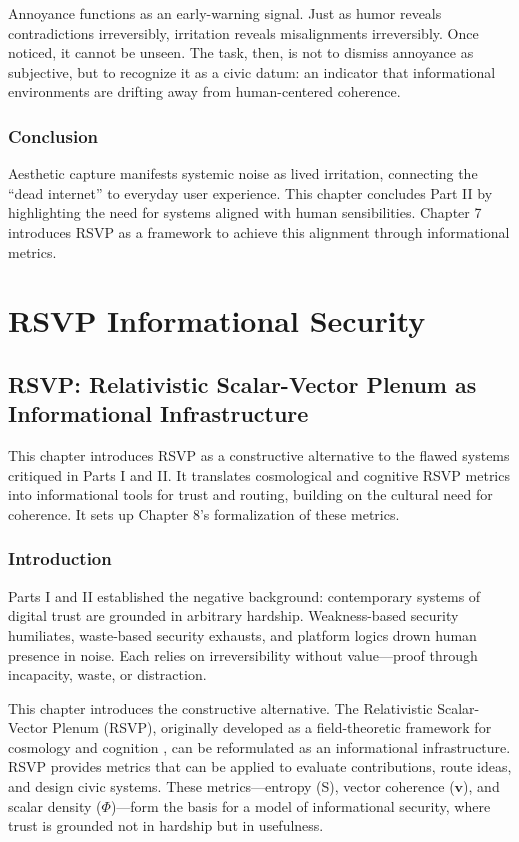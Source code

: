 \documentclass{book}
\begin{document}
Annoyance functions as an early-warning signal. Just as humor reveals contradictions irreversibly, irritation reveals misalignments irreversibly. Once noticed, it cannot be unseen. The task, then, is not to dismiss annoyance as subjective, but to recognize it as a civic datum: an indicator that informational environments are drifting away from human-centered coherence.

\section{Conclusion}

Aesthetic capture manifests systemic noise as lived irritation, connecting the ``dead internet'' to everyday user experience. This chapter concludes Part II by highlighting the need for systems aligned with human sensibilities. Chapter 7 introduces RSVP as a framework to achieve this alignment through informational metrics.

\part{RSVP Informational Security}

\chapter{RSVP: Relativistic Scalar-Vector Plenum as Informational Infrastructure}

This chapter introduces RSVP as a constructive alternative to the flawed systems critiqued in Parts I and II. It translates cosmological and cognitive RSVP metrics into informational tools for trust and routing, building on the cultural need for coherence. It sets up Chapter 8’s formalization of these metrics.

\section{Introduction}

Parts I and II established the negative background: contemporary systems of digital trust are grounded in arbitrary hardship. Weakness-based security humiliates, waste-based security exhausts, and platform logics drown human presence in noise. Each relies on irreversibility without value—proof through incapacity, waste, or distraction.

This chapter introduces the constructive alternative. The Relativistic Scalar-Vector Plenum (RSVP), originally developed as a field-theoretic framework for cosmology and cognition \cite{prigogine1984}, can be reformulated as an informational infrastructure. RSVP provides metrics that can be applied to evaluate contributions, route ideas, and design civic systems. These metrics—entropy (S), vector coherence (\(\mathbf{v}\)), and scalar density (\(\Phi\))—form the basis for a model of informational security, where trust is grounded not in hardship but in usefulness.
\end{document}
